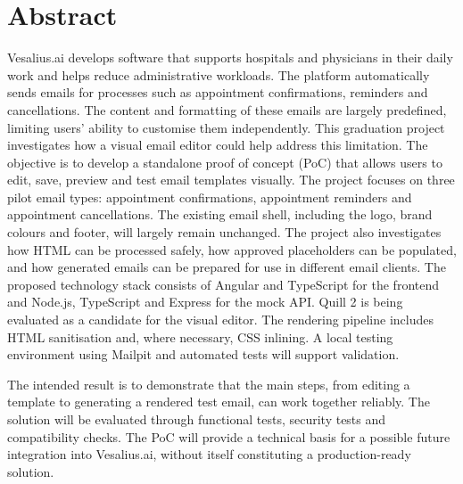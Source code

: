 \chapter*{Abstract}
\label{ch:samenvatting-en}
Vesalius.ai develops software that supports hospitals and physicians in their daily work and helps reduce administrative workloads. 
The platform automatically sends emails for processes such as appointment confirmations, reminders and cancellations. 
The content and formatting of these emails are largely predefined, limiting users' ability to customise them independently. 
This graduation project investigates how a visual email editor could help address this limitation.
The objective is to develop a standalone proof of concept (PoC) that allows users to edit, save, preview and test email templates visually. 
The project focuses on three pilot email types: appointment confirmations, appointment reminders and appointment cancellations. 
The existing email shell, including the logo, brand colours and footer, will largely remain unchanged. 
The project also investigates how HTML can be processed safely, how approved placeholders can be populated, and how generated emails can be prepared for use in different email clients.
The proposed technology stack consists of Angular and TypeScript for the frontend and Node.js, TypeScript and Express for the mock API. 
Quill 2 is being evaluated as a candidate for the visual editor. 
The rendering pipeline includes HTML sanitisation and, where necessary, CSS inlining. 
A local testing environment using Mailpit and automated tests will support validation.

The intended result is to demonstrate that the main steps, from editing a template to generating a rendered test email, can work together reliably. 
The solution will be evaluated through functional tests, security tests and compatibility checks. 
The PoC will provide a technical basis for a possible future integration into Vesalius.ai, without itself constituting a production-ready solution.

